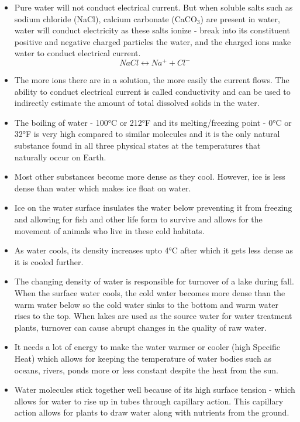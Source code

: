 \begin{itemize}
\item Pure water will not conduct electrical current. But when soluble salts such as sodium chloride (NaCl), calcium carbonate (CaCO$_3$) are present in water, water will conduct electricity as these salts ionize - break into its constituent positive and negative charged particles the water, and the charged ions make water to conduct electrical current.
$$NaCl \leftrightarrow Na^+ + Cl^-$$
\item The more ions there are in a solution, the more easily the current flows. The ability to conduct electrical current is called conductivity and can be used to indirectly estimate the amount of total dissolved solids in the water.\\
\item The boiling of water - 100\si{\degree}C or 212\si{\degree}F and its melting/freezing point - 0\si{\degree}C or 32\si{\degree}F is very high  compared to similar molecules and it is the only natural substance found in all three physical states at the temperatures that naturally occur on Earth.
\item Most other substances become more dense as they cool.  However, ice is less dense than water which makes ice float on water.
\item Ice on the water surface insulates the water below preventing it from freezing and allowing for fish and other life form to survive and allows for the movement of animals who live in these cold habitats.
\item As water cools, its density increases upto 4\si{\degree}C after which it gets less dense as it is cooled further.
\item The changing density of water is responsible for turnover of a lake during fall.  When the surface water cools, the cold water becomes more dense than the warm water below so the cold water sinks to the bottom and warm water rises to the top.  When lakes are used as the source water for water treatment plants, turnover can cause abrupt changes in the quality of raw water.
\item It needs a lot of energy to make the water warmer or cooler (high Specific Heat) which allows for keeping the temperature of water bodies such as oceans, rivers, ponds more or less constant despite the heat from the sun.
\item Water molecules stick together well because of its high surface tension - which allows for water to rise up in tubes through capillary action.  This capillary action allows for plants to draw water along with nutrients from the ground.
\end{itemize}



